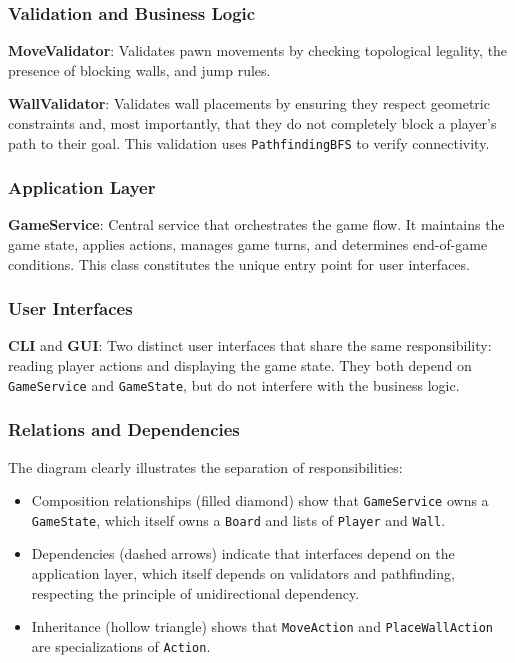\documentclass[a4paper]{article}
\begin{document}
\subsubsection{Validation and Business Logic}

\textbf{MoveValidator}: Validates pawn movements by checking topological
legality, the presence of blocking walls, and jump rules.

\textbf{WallValidator}: Validates wall placements by ensuring they respect
geometric constraints and, most importantly, that they do not completely block
a player's path to their goal. This validation uses \texttt{PathfindingBFS} to
verify connectivity.

\subsubsection{Application Layer}

\textbf{GameService}: Central service that orchestrates the game flow. It
maintains the game state, applies actions, manages game turns, and determines
end-of-game conditions. This class constitutes the unique entry point for user
interfaces.

\subsubsection{User Interfaces}

\textbf{CLI} and \textbf{GUI}: Two distinct user interfaces that share the same
responsibility: reading player actions and displaying the game state. They both
depend on \texttt{GameService} and \texttt{GameState}, but do not interfere with
the business logic.

\subsubsection{Relations and Dependencies}

The diagram clearly illustrates the separation of responsibilities:
\begin{itemize}
  \item Composition relationships (filled diamond) show that
    \texttt{GameService} owns a \texttt{GameState}, which itself owns a
    \texttt{Board} and lists of \texttt{Player} and \texttt{Wall}.
  \item Dependencies (dashed arrows) indicate that interfaces depend on the
    application layer, which itself depends on validators and pathfinding,
    respecting the principle of unidirectional dependency.
  \item Inheritance (hollow triangle) shows that \texttt{MoveAction} and
    \texttt{PlaceWallAction} are specializations of \texttt{Action}.
\end{itemize}
\end{document}
